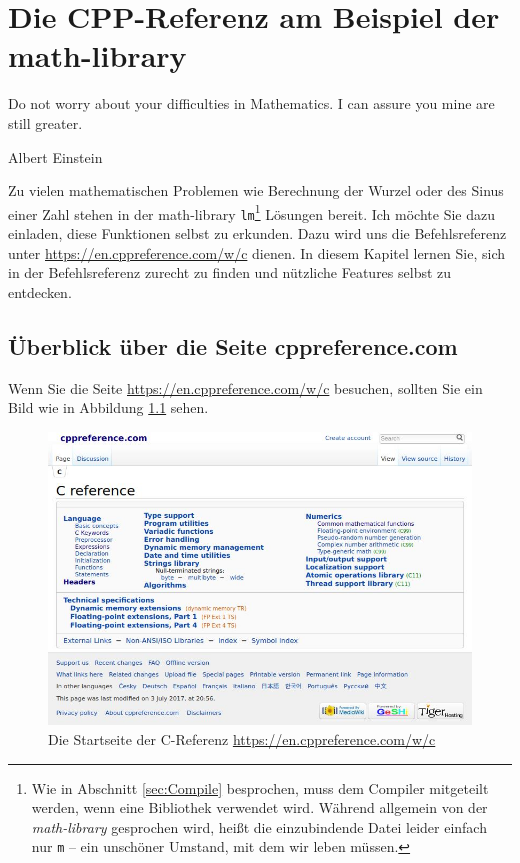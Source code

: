 \chapter{Die CPP-Referenz am Beispiel der math-library}
\epigraph{Do not worry about your difficulties in Mathematics. I can assure you mine are still greater.}{Albert Einstein}

Zu vielen mathematischen Problemen wie Berechnung der Wurzel oder des Sinus einer Zahl stehen in der math-library \texttt{lm}\footnote{Wie in Abschnitt \ref{sec:Compile} besprochen, muss dem Compiler mitgeteilt werden, wenn eine Bibliothek verwendet wird. Während allgemein von der \emph{math-library} gesprochen wird, heißt die einzubindende Datei leider einfach nur \texttt{m} -- ein unschöner Umstand, mit dem wir leben müssen.} Lösungen bereit. Ich möchte Sie dazu einladen, diese Funktionen selbst zu erkunden. Dazu wird uns die Befehlsreferenz unter \url{https://en.cppreference.com/w/c} dienen. In diesem Kapitel lernen Sie, sich in der Befehlsreferenz zurecht zu finden und nützliche Features selbst zu entdecken.

\section{Überblick über die Seite cppreference.com}
Wenn Sie die Seite \url{https://en.cppreference.com/w/c} besuchen, sollten Sie ein Bild wie in Abbildung \ref{fig:cpp-home} sehen.

\begin{figure}[h!]
	\includegraphics[width=\linewidth]{./gfx/cpp-home}
	\caption{Die Startseite der C-Referenz \url{https://en.cppreference.com/w/c}} \label{fig:cpp-home}
\end{figure}

